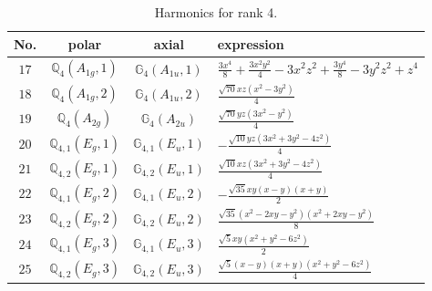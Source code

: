 \documentclass[fleqn,8pt,landscape]{jsarticle}
\begin{document}
\begin{table}[ht!]
\begin{center}
\caption{Harmonics for rank 4.}
\renewcommand{\arraystretch}{1.3}
\begin{tabular}{cccl} \hline \hline
No. & polar & axial & expression \\ \hline
$ 17 $ & $ \mathbb{Q}_{4}(A_{1g},1) $ & $ \mathbb{G}_{4}(A_{1u},1) $ & $ \frac{3 x^{4}}{8} + \frac{3 x^{2} y^{2}}{4} - 3 x^{2} z^{2} + \frac{3 y^{4}}{8} - 3 y^{2} z^{2} + z^{4} $ \\
$ 18 $ & $ \mathbb{Q}_{4}(A_{1g},2) $ & $ \mathbb{G}_{4}(A_{1u},2) $ & $ \frac{\sqrt{70} x z \left(x^{2} - 3 y^{2}\right)}{4} $ \\
$ 19 $ & $ \mathbb{Q}_{4}(A_{2g}) $ & $ \mathbb{G}_{4}(A_{2u}) $ & $ \frac{\sqrt{70} y z \left(3 x^{2} - y^{2}\right)}{4} $ \\
$ 20 $ & $ \mathbb{Q}_{4,1}(E_{g},1) $ & $ \mathbb{G}_{4,1}(E_{u},1) $ & $ - \frac{\sqrt{10} y z \left(3 x^{2} + 3 y^{2} - 4 z^{2}\right)}{4} $ \\
$ 21 $ & $ \mathbb{Q}_{4,2}(E_{g},1) $ & $ \mathbb{G}_{4,2}(E_{u},1) $ & $ \frac{\sqrt{10} x z \left(3 x^{2} + 3 y^{2} - 4 z^{2}\right)}{4} $ \\
$ 22 $ & $ \mathbb{Q}_{4,1}(E_{g},2) $ & $ \mathbb{G}_{4,1}(E_{u},2) $ & $ - \frac{\sqrt{35} x y \left(x - y\right) \left(x + y\right)}{2} $ \\
$ 23 $ & $ \mathbb{Q}_{4,2}(E_{g},2) $ & $ \mathbb{G}_{4,2}(E_{u},2) $ & $ \frac{\sqrt{35} \left(x^{2} - 2 x y - y^{2}\right) \left(x^{2} + 2 x y - y^{2}\right)}{8} $ \\
$ 24 $ & $ \mathbb{Q}_{4,1}(E_{g},3) $ & $ \mathbb{G}_{4,1}(E_{u},3) $ & $ \frac{\sqrt{5} x y \left(x^{2} + y^{2} - 6 z^{2}\right)}{2} $ \\
$ 25 $ & $ \mathbb{Q}_{4,2}(E_{g},3) $ & $ \mathbb{G}_{4,2}(E_{u},3) $ & $ \frac{\sqrt{5} \left(x - y\right) \left(x + y\right) \left(x^{2} + y^{2} - 6 z^{2}\right)}{4} $ \\
 \hline \hline
\end{tabular}
\end{center}
\end{table}
\end{document}
